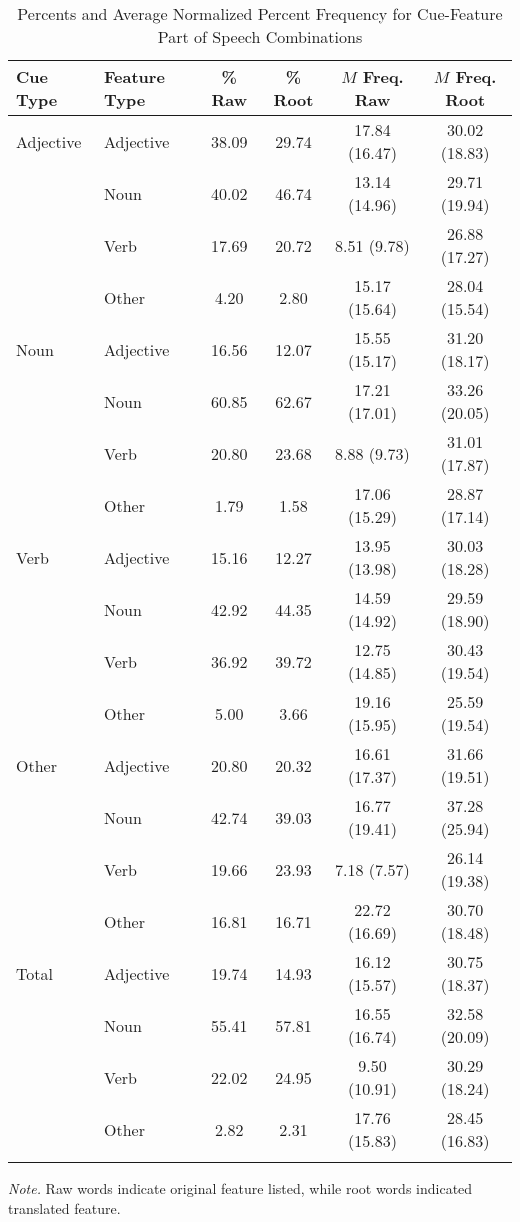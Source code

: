 \documentclass[english,man]{apa6}
\theoremstyle{definition}
\theoremstyle{definition}
\theoremstyle{definition}
\theoremstyle{remark}
\begin{document}
\begin{table}[tbp]
\begin{center}
\begin{threeparttable}
\caption{\label{tab:percent-table}Percents and Average Normalized Percent Frequency for Cue-Feature Part of Speech Combinations}
\begin{tabular}{llcccc}
\toprule
Cue Type & Feature Type & \% Raw & \% Root & $M$ Freq. Raw & $M$ Freq. Root\\
\midrule
Adjective & Adjective & 38.09 & 29.74 & 17.84 (16.47) & 30.02 (18.83)\\
 & Noun & 40.02 & 46.74 & 13.14 (14.96) & 29.71 (19.94)\\
 & Verb & 17.69 & 20.72 & 8.51 (9.78) & 26.88 (17.27)\\
 & Other & 4.20 & 2.80 & 15.17 (15.64) & 28.04 (15.54)\\
Noun & Adjective & 16.56 & 12.07 & 15.55 (15.17) & 31.20 (18.17)\\
 & Noun & 60.85 & 62.67 & 17.21 (17.01) & 33.26 (20.05)\\
 & Verb & 20.80 & 23.68 & 8.88 (9.73) & 31.01 (17.87)\\
 & Other & 1.79 & 1.58 & 17.06 (15.29) & 28.87 (17.14)\\
Verb & Adjective & 15.16 & 12.27 & 13.95 (13.98) & 30.03 (18.28)\\
 & Noun & 42.92 & 44.35 & 14.59 (14.92) & 29.59 (18.90)\\
 & Verb & 36.92 & 39.72 & 12.75 (14.85) & 30.43 (19.54)\\
 & Other & 5.00 & 3.66 & 19.16 (15.95) & 25.59 (19.54)\\
Other & Adjective & 20.80 & 20.32 & 16.61 (17.37) & 31.66 (19.51)\\
 & Noun & 42.74 & 39.03 & 16.77 (19.41) & 37.28 (25.94)\\
 & Verb & 19.66 & 23.93 & 7.18 (7.57) & 26.14 (19.38)\\
 & Other & 16.81 & 16.71 & 22.72 (16.69) & 30.70 (18.48)\\
Total & Adjective & 19.74 & 14.93 & 16.12 (15.57) & 30.75 (18.37)\\
 & Noun & 55.41 & 57.81 & 16.55 (16.74) & 32.58 (20.09)\\
 & Verb & 22.02 & 24.95 & 9.50 (10.91) & 30.29 (18.24)\\
 & Other & 2.82 & 2.31 & 17.76 (15.83) & 28.45 (16.83)\\
\bottomrule
\addlinespace
\end{tabular}
\begin{tablenotes}[para]
\textit{Note.} Raw words indicate original feature listed, while root words indicated translated feature. 
\end{tablenotes}
\end{threeparttable}
\end{center}
\end{table}
\end{document}
